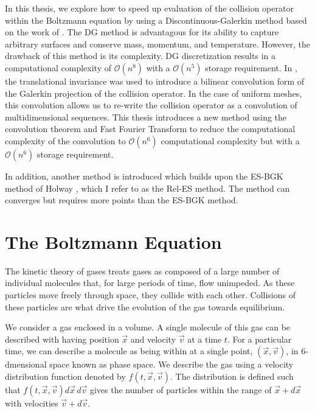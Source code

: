 \documentclass[12pt]{CSUNthesis}
\newcommand{\vecx}{\vec{x}}
\newcommand{\vecv}{\vec{v}}
\begin{document}
In this thesis, we explore how to speed up evaluation of the collision operator within the Boltzmann equation by using a Discontinuous-Galerkin method based on the work of \cite{Majorana2011,AlekseenkoJosyula2012,AlekseenkoJosyula2012a}. The DG method is advantagous for its ability to capture arbitrary surfaces and conserve mass, momentum, and temperature. However, the drawback of this method is its complexity. DG discretization results in a computational complexity of $\mathcal{O}(n^8)$ with a $\mathcal{O}(n^5)$ storage requirement. In \cite{AlekseenkoNguyenWood2015}, the translational invariance was used to introduce a bilinear convolution form of the Galerkin projection of the collision operator. In the case of uniform meshes, this convolution allows us to re-write the collision operator as a convolution of multidimensional sequences. This thesis introduces a new method using the convolution theorem and Fast Fourier Transform to reduce the computational complexity of the convolution to $\mathcal{O}(n^6)$ computational complexity but with a $\mathcal{O}(n^6)$ storage requirement.

In addition, another method is introduced which builds upon the ES-BGK method of Holway \cite{H66}, which I refer to as the Rel-ES method. The method can converges but requires more points than the ES-BGK method. 

\chapter{The Boltzmann Equation}
\label{Chap2}

	The kinetic theory of gases treats gases as composed of a large number of individual molecules that, for large periods of time, flow unimpeded. As these particles move freely through space, they collide with each other. Collisions of these particles are what drive the evolution of the gas towards equilibrium.
	
	We consider a gas enclosed in a volume. A single molecule of this gas can be described with having position $\vec{x}$ and velocity $\vec{v}$ at a time $t$. For a particular time, we can describe a molecule as being within at a single point, $(\vec{x},\vec{v})$, in 6-dmensional space known as phase space. We describe the gas using a velocity distribution function denoted by $f(t,\vecx,\vecv)$. The distribution is defined such that $f(t,\vec{x},\vec{v})d\vec{x}\,d\vec{v}$ gives the number of particles within the range of $\vec{x} + d\vec{x}$ with velocities $\vec{v} + d\vec{v}$. 
\end{document}
